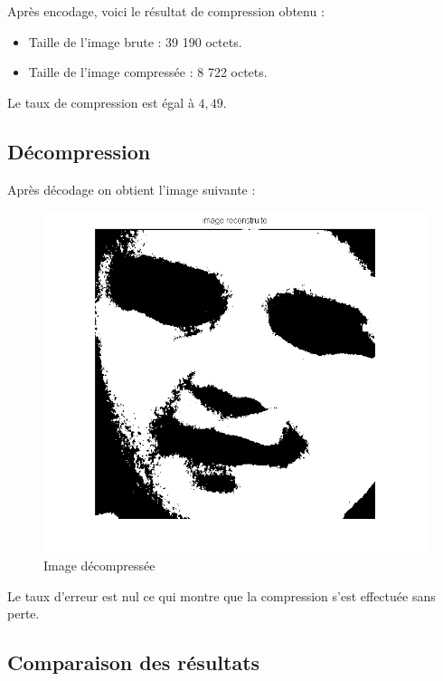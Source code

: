 \documentclass[11pt]{article}
\begin{document}
  \begin{itemize}
  \end{itemize}
  Après encodage, voici le résultat de compression obtenu :\\
  \begin{itemize}
  	\item Taille de l'image brute : 39 190 octets.
  	\item Taille de l'image compressée : 8 722 octets.
  \end{itemize}
  Le taux de compression est égal à $4,49$.
  
  \newpage
  \subsection{Décompression}
  
  Après décodage on obtient l'image suivante :

  	\begin{figure}[H]
  	  \centering
  	  \includegraphics[scale=0.6]{img/img_dec.png}
  	  \caption{Image décompressée}
  	  \label{img2}
  	\end{figure}
  	
  	Le taux d'erreur est nul ce qui montre que la compression s'est effectuée sans perte.
  
  \subsection{Comparaison des résultats}
  
\end{document}
